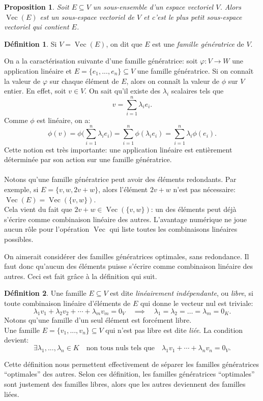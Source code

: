 \documentclass[oneside,12pt,french,table]{book}
\DeclareMathOperator{\Span}{Vec}
\newtheorem{prop}{Proposition}[section]
\theoremstyle{definition}
\theoremstyle{definition}
\theoremstyle{definition}
\newtheorem{definition}{Définition}[chapter]
\begin{document}
\begin{prop} Soit $E \subseteq V$ un sous-ensemble d'un espace vectoriel $V$. Alors $\Span(E)$ est un sous-espace vectoriel de $V$ et c'est le plus petit sous-espace vectoriel qui contient $E$.
\end{prop}
\begin{definition}
Si $V = \Span(E)$, on dit que $E$ est une \textit{famille génératrice} de $V$.
\end{definition}
\par
On a la caractérisation suivante d'une famille génératrice: soit $\varphi : V \longrightarrow W$ une application linéaire et $E = \{e_1,...,e_n\} \subseteq V$ une famille génératrice. Si on connaît la valeur de $\varphi$ sur chaque élément de $E$, alors on connaît la valeur de $\phi$ sur $V$ entier. En effet, soit $v \in V$. On sait qu'il existe des $\lambda_i$ scalaires tels que $$v = \sum_{i=1}^{n} \lambda_i e_i.$$
Comme $\phi$ est linéaire, on a:
$$\phi(v)= \phi \Bigg( \sum_{i=1}^{n} \lambda_i e_i \Bigg) =  \sum_{i=1}^{n} \phi(\lambda_i e_i) = \sum_{i=1}^{n} \lambda_i \phi(e_i).$$
Cette notion est très importante: une application linéaire est entièrement déterminée par son action sur une famille génératrice. \\ \\
Notons qu'une famille génératrice peut avoir des éléments redondants. Par exemple, si $E = \{ v, w, 2v+w \}$, alors l'élément $2v+w$ n'est pas nécessaire: $\Span(E) = \Span( \{ v,w \} )$. \\
Cela vient du fait que $2v+w \in \Span( \{v,w\})$: un des éléments peut déjà s'écrire comme combinaison linéaire des autres. L'avantage numérique ne joue aucun rôle pour l'opération $\Span$ qui liste toutes les combinaisons linéaires possibles.
\par
On aimerait considérer des familles génératrices optimales, sans redondance. Il faut donc qu'aucun des éléments puisse s'écrire comme combinaison linéaire des autres. Ceci est fait grâce à la définition qui suit.
\begin{definition}
Une famille $E \subseteq V$ est dite \textit{linéairement indépendante}, ou \textit{libre}, si toute combinaison linéaire d'éléments de $E$ qui donne le vecteur nul est triviale:
$$\lambda_{1} v_{1}+\lambda_{2} v_{2}+\cdots+\lambda_{m} v_{m}=0_{V} \quad \implies \quad \lambda_{1}=\lambda_{2}=\ldots=\lambda_{m}=0_K.$$
Notons qu'une famille d'un seul élément est forcément libre. \\
Une famille $E = \{v_1,...,v_n \} \subseteq V$ qui n'est pas libre est dite \textit{liée}. La condition devient:
$$\exists \lambda_1,...,\lambda_n \in K \quad\text{non tous nuls tels que}\quad \lambda_1 v_1 + \cdots + \lambda_n v_n = 0_V.$$
\end{definition}
\par
    Cette définition nous permettent effectivement de séparer les familles génératrices ``optimales'' des autres. Selon ces définition, les familles génératrices ``optimales'' sont justement des familles libres, alors que les autres deviennent des familles liées.
    
\end{document}
